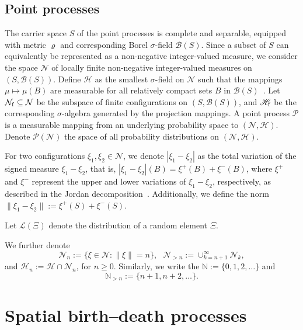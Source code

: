 \documentclass[12pt]{article}
\newcommand{\Pro}{\mathbb{P}}
\newcommand{\prob}{\Pro}
\newcommand{\N}{\mathbb{N}}
\newcommand{\Pn}{{\rm Pn}}
\newcommand{\Po}{{\rm Po}}
\newcounter{con}%
\numberwithin{equation}{section}
\begin{document}
\subsection*{Point processes}
The carrier space $S$ of the point processes is complete and separable, equipped with metric $\varrho$ and corresponding Borel $\sigma$-field $\mathscr{B}(S)$.
Since a subset of $S$ can equivalently be represented as a non-negative integer-valued measure, we consider the space $\mathcal{N}$ of locally finite non-negative integer-valued measures on $(S,\mathscr{B}(S))$. 
Define $\mathscr{H}$ as the smallest $\sigma$-field on $\mathcal{N}$ such that the mappings $\mu\mapsto\mu(B)$ are measurable for all relatively compact sets $B$ in $\mathscr{B}(S)$~\cite[\S1.1]{kallenberg83}. Let $\mathcal{N}_{\rm f}\subseteq \mathcal{N}$ be the subspace of finite configurations on $(S,\mathscr{B}(S))$, and $\mathscr{H}_{\rm f}$ be the corresponding $\sigma$-algebra generated by the projection mappings.
A point process $\mathcal{P}$ is a measurable mapping from an underlying probability space to $(\mathcal{N},\mathscr{H})$.
Denote $\mathscr{P}(\mathcal{N})$ the space of all probability distributions on $(\mathcal{N},\mathscr{H})$.

For two configurations $\xi_1,\xi_2\in\mathcal{N}$, we denote $|\xi_1-\xi_2|$ as the total variation of the signed measure $\xi_1-\xi_2$, that is,
$|\xi_1-\xi_2|(B)=\xi^+(B)+\xi^-(B)$, where $\xi^+$ and $\xi^-$ represent the upper and lower variations of $\xi_1-\xi_2$, respectively, as described in the Jordan decomposition~\cite[p.~421]{B95}. Additionally, we define the norm $\|\xi_1-\xi_2\|:=\xi^+(S)+\xi^-(S)$.

Let $\mathcal{L}(\Xi)$ denote the distribution of a random element $\Xi$. %

We further denote
$$
\mathcal{N}_n:=\{\xi\in\mathcal{N}:\|\xi\|=n\},~~~
\mathcal{N}_{>n}:=\cup_{k=n+1}^{\infty}\mathcal{N}_k,
$$
and $\mathscr{H}_n:=\mathscr{H}\cap\mathcal{N}_n$, for $n\ge0$. 
Similarly, we write the $\N:=\{0,1,2,\dots\}$ and 
$$\N_{>n}:=\{n+1,n+2,\dots\}.$$
\section{Spatial birth--death processes}
\end{document}
